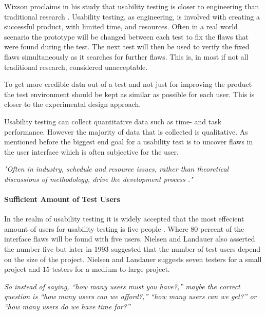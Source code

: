 Wixson proclaims in his study that usability testing is closer to engineering than traditional research \cite{wixon2003evaluating}. Usability testing, as engineering, is involved with creating a successful product, with limited time, and resources. Often in a real world scenario the prototype will be changed between each test to fix the flaws that were found during the test. The next test will then be used to verify the fixed flaws simultaneously as it searches for further flaws. This is, in most if not all traditional research, considered unacceptable. 

To get more credible data out of a test and not just for improving the product the test environment should be kept as similar as possible for each user. This is closer to the experimental design approach. 

Usability testing can collect quantitative data such as time- and task performance. However the majority of data that is collected is qualitative. As mentioned before the biggest end goal for a usability test is to uncover flaws in the user interface which is often subjective for the user.

\textit{"Often in industry, schedule and resource issues, rather than theoretical discussions of methodology, drive the development process \cite{wixon2003evaluating}."}

\paragraph{Sufficient Amount of Test Users}
\label{ssub:Sufficient Amount of Test Users}

In the realm of usability testing it is widely accepted that the most effecient amount of users for usability testing is five people \cite{virzi1992refining}. Where 80 percent of the interface flaws will be found with five users. Nielsen and Landauer also asserted the number five but later in 1993 suggested that the number of test users depend on the size of the project\cite{nielsen1993mathematical}. Nielsen and Landauer suggests seven testers for a small project and 15 testers for a medium-to-large project. 


\textit{
So instead of saying, “how many users must you have?,” maybe the correct question is “how many users can we afford?,” “how many users can we get?” or “how many users do we have time for?”
} \cite{lazar2017research} 




